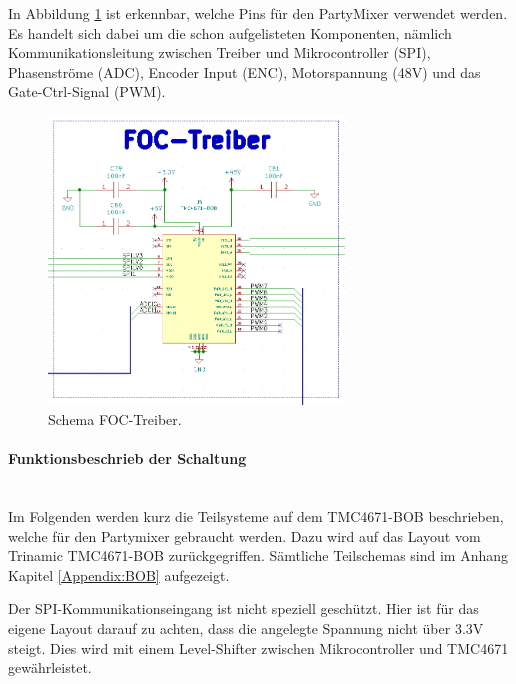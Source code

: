 In Abbildung \ref{fig:Schema_FOC_Treiber} ist erkennbar, welche Pins für den PartyMixer verwendet werden. Es handelt sich dabei um die schon aufgelisteten Komponenten, nämlich Kommunikationsleitung zwischen Treiber und Mikrocontroller (SPI), Phasenströme (ADC), Encoder Input (ENC), Motorspannung (48V) und das Gate-Ctrl-Signal (PWM).

\begin{figure}[H]
	\centering
	\includegraphics[width=0.7\textwidth]{graphics/Schema_FOC_Treiber}
	\caption{Schema FOC-Treiber.}
	\label{fig:Schema_FOC_Treiber}
\end{figure} 

\paragraph{Funktionsbeschrieb der Schaltung}\mbox{}\\

Im Folgenden werden kurz die Teilsysteme auf dem TMC4671-BOB beschrieben, welche für den Partymixer gebraucht werden. Dazu wird auf das Layout vom Trinamic TMC4671-BOB zurückgegriffen. Sämtliche Teilschemas sind im Anhang Kapitel \ref{Appendix:BOB} aufgezeigt. \cite{trinamicmotion_control_gmbh__co_kg_tmc4671-bob_2020}


Der SPI-Kommunikationseingang ist nicht speziell geschützt. Hier ist für das eigene Layout darauf zu achten, dass die angelegte Spannung nicht über 3.3V steigt. Dies wird mit einem Level-Shifter zwischen Mikrocontroller und TMC4671 gewährleistet.


